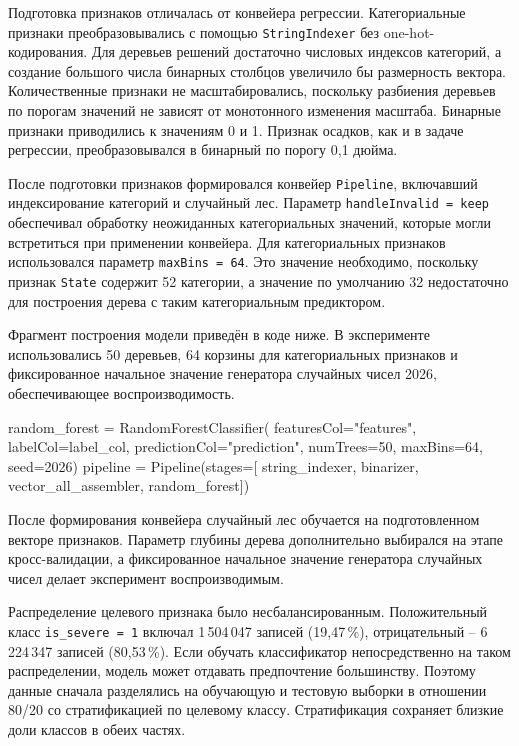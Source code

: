 Подготовка признаков отличалась от конвейера регрессии. Категориальные признаки преобразовывались с помощью \texttt{StringIndexer} без one-hot-кодирования. Для деревьев решений достаточно числовых индексов категорий, а создание большого числа бинарных столбцов увеличило бы размерность вектора. Количественные признаки не масштабировались, поскольку разбиения деревьев по порогам значений не зависят от монотонного изменения масштаба. Бинарные признаки приводились к значениям 0 и 1. Признак осадков, как и в задаче регрессии, преобразовывался в бинарный по порогу 0,1 дюйма.

После подготовки признаков формировался конвейер \texttt{Pipeline}, включавший индексирование категорий и случайный лес. Параметр \texttt{handleInvalid = keep} обеспечивал обработку неожиданных категориальных значений, которые могли встретиться при применении конвейера. Для категориальных признаков использовался параметр \texttt{maxBins = 64}. Это значение необходимо, поскольку признак \texttt{State} содержит 52 категории, а значение по умолчанию 32 недостаточно для построения дерева с таким категориальным предиктором.

Фрагмент построения модели приведён в коде ниже. В эксперименте использовались 50 деревьев, 64 корзины для категориальных признаков и фиксированное начальное значение генератора случайных чисел 2026, обеспечивающее воспроизводимость.

\begin{code}
random_forest = RandomForestClassifier(
    featuresCol="features",
    labelCol=label_col,
    predictionCol="prediction",
    numTrees=50,
    maxBins=64,
    seed=2026)
pipeline = Pipeline(stages=[
    string_indexer, binarizer,
    vector_all_assembler, random_forest])
\end{code}

После формирования конвейера случайный лес обучается на подготовленном векторе признаков. Параметр глубины дерева дополнительно выбирался на этапе кросс-валидации, а фиксированное начальное значение генератора случайных чисел делает эксперимент воспроизводимым.

Распределение целевого признака было несбалансированным. Положительный класс \texttt{is\_severe = 1} включал 1\,504\,047 записей (19,47\,\%), отрицательный -- 6\,224\,347 записей (80,53\,\%). Если обучать классификатор непосредственно на таком распределении, модель может отдавать предпочтение большинству. Поэтому данные сначала разделялись на обучающую и тестовую выборки в отношении 80/20 со стратификацией по целевому классу. Стратификация сохраняет близкие доли классов в обеих частях.

